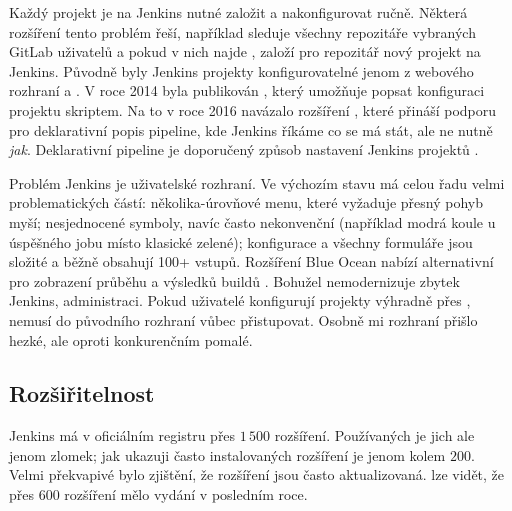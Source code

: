         Každý projekt je na Jenkins nutné založit a nakonfigurovat ručně. Některá rozšíření tento problém řeší, například  \cite{jenkins-plugins-gbs} sleduje všechny repozitáře vybraných GitLab uživatelů a pokud v nich najde , založí pro repozitář nový projekt na Jenkins. Původně byly Jenkins projekty konfigurovatelné jenom z webového rozhraní a . V roce 2014 byla publikován , který umožňuje popsat konfiguraci projektu skriptem. Na to v roce 2016 navázalo rozšíření , které přináší podporu pro deklarativní popis pipeline, kde Jenkins říkáme co se má stát, ale ne nutně \textit{jak}. Deklarativní pipeline je doporučený způsob nastavení Jenkins projektů \cite{jenkins-best-practices}.

        Problém Jenkins je uživatelské rozhraní. Ve výchozím stavu má  celou řadu velmi problematických částí: několika-úrovňové menu, které vyžaduje přesný pohyb myší; nesjednocené symboly, navíc často nekonvenční (například modrá koule u úspěšného jobu místo klasické zelené); konfigurace a všechny formuláře jsou složité a běžně obsahují 100+ vstupů. Rozšíření Blue Ocean nabízí alternativní  pro zobrazení průběhu a výsledků buildů \cite{jenkins-plugin-blueocean}. Bohužel nemodernizuje zbytek Jenkins, administraci. Pokud uživatelé konfigurují projekty výhradně přes , nemusí do původního rozhraní vůbec přistupovat. Osobně mi rozhraní přišlo hezké, ale oproti konkurenčním \CICD pomalé.

    \subsection{Rozšiřitelnost}
        Jenkins má v oficiálním registru přes $1\,500$ rozšíření. Používaných je jich ale jenom zlomek; jak ukazuji  často instalovaných rozšíření je jenom kolem $200$. Velmi překvapivé bylo zjištění, že rozšíření jsou často aktualizovaná.  lze vidět, že přes $600$ rozšíření mělo vydání v posledním roce.

